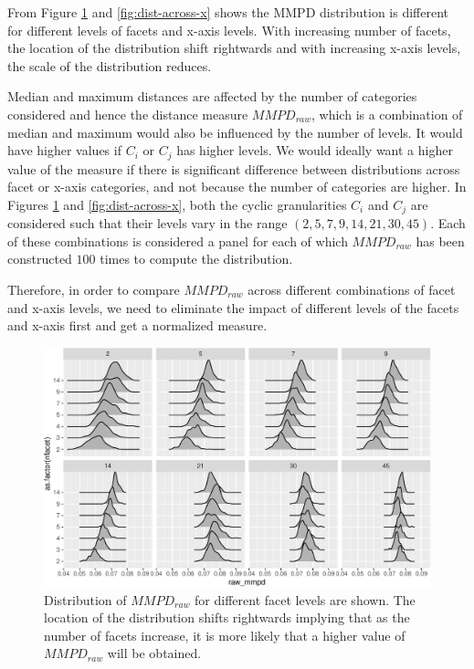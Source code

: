 \documentclass[
]{article}
\begin{document}
From Figure \ref{fig:dist-across-facets} and \ref{fig:dist-across-x} shows the MMPD distribution is different for different levels of facets and x-axis levels. With increasing number of facets, the location of the distribution shift rightwards and with increasing x-axis levels, the scale of the distribution reduces.

Median and maximum distances are affected by the number of categories considered and hence the distance measure \(MMPD_{raw}\), which is a combination of median and maximum would also be influenced by the number of levels. It would have higher values if \(C_i\) or \(C_j\) has higher levels. We would ideally want a higher value of the measure if there is significant difference between distributions across facet or x-axis categories, and not because the number of categories are higher. In Figures \ref{fig:dist-across-facets} and \ref{fig:dist-across-x}, both the cyclic granularities \(C_i\) and \(C_j\) are considered such that their levels vary in the range \((2, 5,7 ,9, 14, 21, 30, 45)\). Each of these combinations is considered a panel for each of which \(MMPD_{raw}\) has been constructed \(100\) times to compute the distribution.

Therefore, in order to compare \(MMPD_{raw}\) across different combinations of facet and x-axis levels, we need to eliminate the impact of different levels of the facets and x-axis first and get a normalized measure.

\begin{figure}

{\centering \includegraphics[width=\textwidth]{figure/dist-across-facets-1} 

}

\caption{Distribution of $MMPD_{raw}$ for different facet levels are shown. The location of the distribution shifts rightwards implying that as the number of facets increase, it is more likely that a higher value of $MMPD_{raw}$ will be obtained. }\label{fig:dist-across-facets}
\end{figure}
\end{document}
